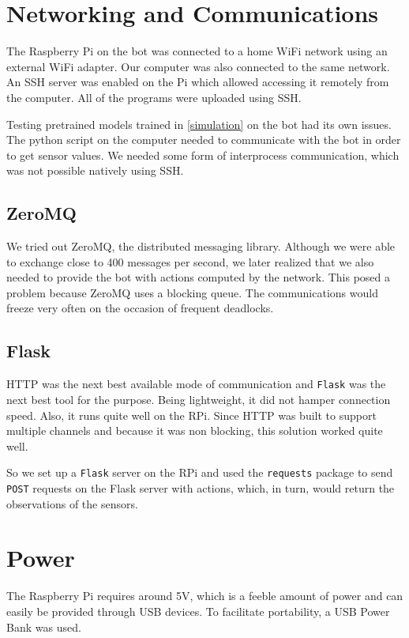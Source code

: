 \documentclass[12pt]{extreport}
\begin{document}
\section{Networking and Communications}
The Raspberry Pi on the bot was connected to a home WiFi network using an external WiFi adapter. Our computer was also connected to the same network.
An SSH server was enabled on the Pi which allowed accessing it remotely from the computer. All of the programs were uploaded using SSH.

Testing pretrained models trained in \autoref{simulation} on the bot had its own issues. The python script on the computer needed to communicate with the bot in order to get sensor values. We needed some form of interprocess communication, which was not possible natively using SSH.

\subsection{ZeroMQ}
We tried out ZeroMQ, the distributed messaging library. Although we were able to exchange close to 400 messages per second, we later realized that we also needed to provide the bot with actions computed by the network. This posed a problem because ZeroMQ uses a blocking queue. The communications would freeze very often on the occasion of frequent deadlocks.

\subsection{Flask}
HTTP was the next best available mode of communication and \texttt{Flask} was the next best tool for the purpose. Being lightweight, it did not hamper connection speed. Also, it runs quite well on the RPi. Since HTTP was built to support multiple channels and because it was non blocking, this solution worked quite well.

So we set up a \texttt{Flask} server on the RPi and used the \texttt{requests} package to send \texttt{POST} requests on the Flask server with actions, which, in turn, would return the observations of the sensors.

\section{Power}

The Raspberry Pi requires around 5V, which is a feeble amount of power and can easily be provided through USB devices. To facilitate portability, a USB Power Bank was used.
\end{document}
